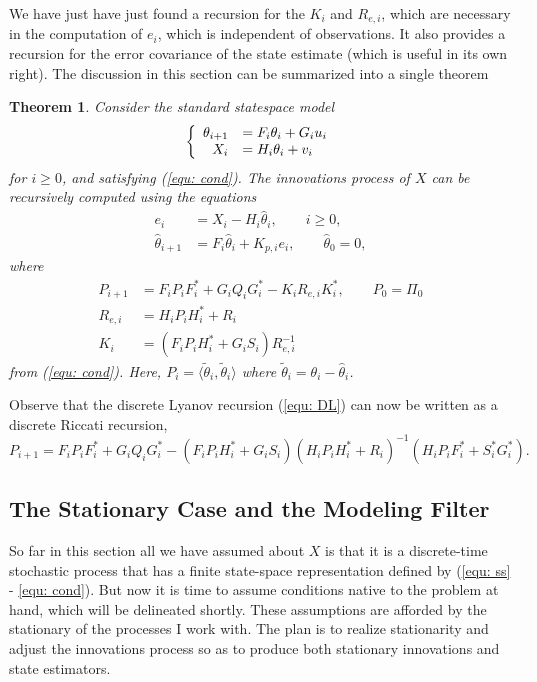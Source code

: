 \documentclass[12pt]{amsart}
\newtheorem{theorem}{Theorem}
\begin{document}
We have just have just found a recursion for the $K_i$ and $R_{e,i}$, which are necessary in the computation of $e_i$, which is independent of observations. It also provides a recursion for the error covariance of the state estimate (which is useful in its own right).  The discussion in this section can be summarized into a single theorem
\begin{theorem}
	\label{thm: innov}
	Consider the standard statespace model
	$$\left\{\begin{array}{ r l}
	\theta_{i+1} &= F_i\theta_i + G_iu_i \\
	X_i &= H_i\theta_i + v_i
	\end{array}\right. $$
	for $i\ge 0$, and satisfying (\ref{equ: cond}). The innovations process of $X$ can be recursively computed using the equations
	\begin{subequations}
		\label{equ: innovations}
		\begin{align}
	e_i &= X_i - H_i\hat{\theta}_i, \qquad i \ge 0,\\
	\hat{\theta}_{i+1} &= F_i\hat{\theta}_i + K_{p,i}e_i,\qquad \hat{\theta}_0 = 0,
	\end{align}
	\end{subequations}
	where \begin{subequations}
		\label{equ: Kal}
		\begin{align}
		\label{equ: Kal Pi}  P_{i+1} &= F_iP_{i}F_i^* + G_iQ_iG_i^* - K_iR_{e,i}K^*_i,\qquad P_0 = \Pi_0 \\
		\label{equ: Kal Rei} R_{e,i} &= H_iP_iH^*_i + R_i \\
		\label{equ: Kal Ki}  K_i &= (F_iP_iH_i^* + G_iS_i) R_{e,i}^{-1}
		\end{align}
	\end{subequations}
	from (\ref{equ: cond}). Here, $P_i = \langle \tilde{\theta}_i,\tilde{\theta}_i \rangle$ where $\tilde{\theta}_i = \theta_i - \hat{\theta}_i$.
\end{theorem}

Observe that the discrete Lyanov recursion (\ref{equ: DL}) can now be written as a discrete Riccati recursion,
$$ P_{i+1} = F_iP_{i}F_i^* + G_iQ_iG_i^* - (F_iP_iH_i^* + G_iS_i)(H_iP_iH^*_i + R_i)^{-1}(H_iP_iF_i^* + S^*_iG^*_i).$$

\subsection{The Stationary Case and the Modeling Filter}

So far in this section all we have assumed about $X$ is that it is a discrete-time stochastic process that has a finite state-space representation defined by (\ref{equ: ss} - \ref{equ: cond}). But now it is time to assume conditions native to the problem at hand, which will be delineated shortly. These assumptions are afforded by the stationary of the processes I work with.  The plan is to realize stationarity and adjust the innovations process so as to produce both stationary innovations and state estimators.
 
\end{document}
